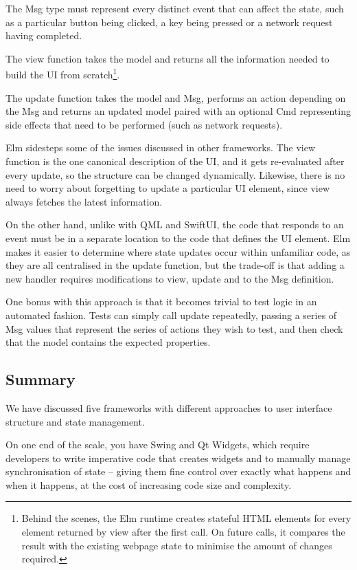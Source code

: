 \documentclass[11pt]{report}
\begin{document}
The Msg type must represent every distinct event that can affect the state, such as a particular button being clicked, a key being pressed or a network request having completed.

The view function takes the model and returns all the information needed to build the UI from scratch\footnote{Behind the scenes, the Elm runtime creates stateful HTML elements for every element returned by view after the first call. On future calls, it compares the result with the existing webpage state to minimise the amount of changes required.}.

The update function takes the model and Msg, performs an action depending on the Msg and returns an updated model paired with an optional Cmd representing side effects that need to be performed (such as network requests).

Elm sidesteps some of the issues discussed in other frameworks. The view function is the one canonical description of the UI, and it gets re-evaluated after every update, so the structure can be changed dynamically. Likewise, there is no need to worry about forgetting to update a particular UI element, since view always fetches the latest information.

On the other hand, unlike with QML and SwiftUI, the code that responds to an event must be in a separate location to the code that defines the UI element. Elm makes it easier to determine where state updates occur within unfamiliar code, as they are all centralised in the update function, but the trade-off is that adding a new handler requires modifications to view, update and to the Msg definition.

One bonus with this approach is that it becomes trivial to test logic in an automated fashion. Tests can simply call update repeatedly, passing a series of Msg values that represent the series of actions they wish to test, and then check that the model contains the expected properties.

\subsection{Summary}

We have discussed five frameworks with different approaches to user interface structure and state management.

On one end of the scale, you have Swing and Qt Widgets, which require developers to write imperative code that creates widgets and to manually manage synchronisation of state – giving them fine control over exactly what happens and when it happens, at the cost of increasing code size and complexity.
\end{document}
